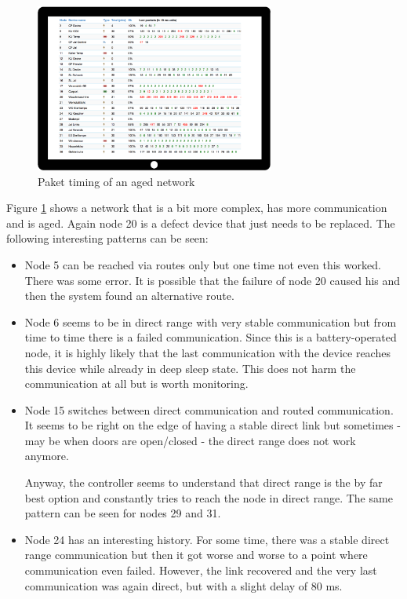 \begin{figure}
\begin{center}
\includegraphics[width=0.7\textwidth]{pngs/cap8/c5timinginfo2.pdf}
\caption{Paket timing of an aged \zwave network}
\label{c5:snifferaged}
\end{center}
\end{figure}

Figure \ref{c5:snifferaged} shows a network that is a bit more complex, has more 
communication and is aged. Again node 20 is a defect device that just needs to be 
replaced. The following interesting patterns can be seen:

\begin{itemize}
\item Node 5 can be reached via routes only but one time not even this worked. There was 
some error. It is possible that the failure of node 20 caused his and then the system 
found an alternative route.
\item Node 6 seems to be in direct range with very stable communication but from time 
to time there is a failed communication. Since this is a battery-operated node, it is 
highly likely that the last communication with the device reaches this device while already 
in deep sleep state. This does not harm the communication at all but is worth monitoring.
\item Node 15 switches between direct communication and routed communication. It seems 
to be right on the edge of having a stable direct link but sometimes - may be when doors 
are open/closed - the direct range does not work anymore.


Anyway, the controller seems to understand that direct range is the by far best option and 
constantly tries to reach the node in direct range. The same pattern can be seen for nodes 29 and 31.
\item Node 24 has an interesting history. For some time, there was a stable direct range 
communication but then it got worse and worse to a point where communication even failed. 
However, the link recovered and the very last communication was again direct, but with a 
slight delay of 80 ms.
\end{itemize}

